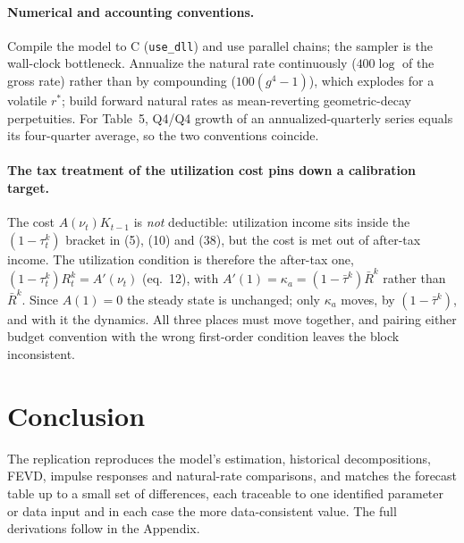 \documentclass[11pt]{article}
\theoremstyle{definition}
\newcommand{\rstar}{r^{*}}
\begin{document}
\paragraph{Numerical and accounting conventions.}
Compile the model to C (\texttt{use\_dll}) and use parallel chains; the sampler is the wall-clock
bottleneck. Annualize the natural rate continuously ($400\log$ of the gross rate) rather than by
compounding ($100(g^4-1)$), which explodes for a volatile $\rstar$; build forward natural rates as
mean-reverting geometric-decay perpetuities. For Table~5, Q4/Q4 growth of an annualized-quarterly series
equals its four-quarter average, so the two conventions coincide.

\paragraph{The tax treatment of the utilization cost pins down a calibration target.}
The cost $A(\nu_t)K_{t-1}$ is \emph{not} deductible: utilization income sits inside the
$(1-\tau^k_t)$ bracket in (5), (10) and (38), but the cost is met out of after-tax income. The
utilization condition is therefore the after-tax one, $(1-\tau^k_t)R^k_t=A'(\nu_t)$ (eq.\ 12), with
$A'(1)=\kappa_a=(1-\bar\tau^k)\bar R^k$ rather than $\bar R^k$. Since $A(1)=0$ the steady state is
unchanged; only $\kappa_a$ moves, by $(1-\bar\tau^k)$, and with it the dynamics. All three places must
move together, and pairing either budget convention with the wrong first-order condition leaves the
block inconsistent.

\section{Conclusion}\label{sec:conclusion}
The replication reproduces the model's estimation, historical decompositions, FEVD, impulse responses
and natural-rate comparisons, and matches the forecast table up to a small set of differences, each
traceable to one identified parameter or data input and in each case the more data-consistent value.
The full derivations follow in the Appendix.

\end{document}
